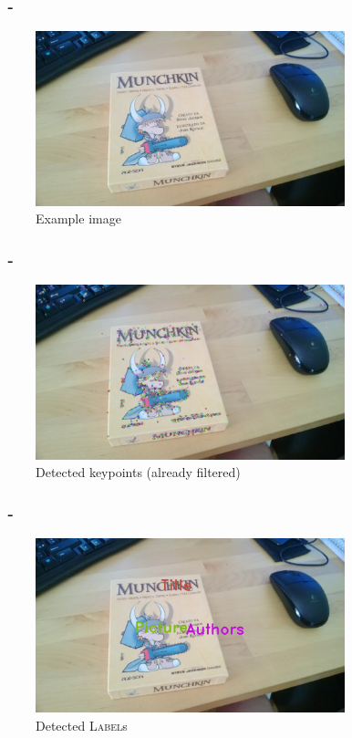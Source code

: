\documentclass{beamer}
\begin{document}
  \begin{frame}
    \frametitle{\insertsection\ - \insertsubsection}
	\begin{figure}
		\centering
          \includegraphics[width=0.8\textwidth]{images/sample.jpg}
        \caption{Example image\label{fig:example}}
	\end{figure}
  \end{frame}

  \begin{frame}
    \frametitle{\insertsection\ - \insertsubsection}
	\begin{figure}
		\centering
          \includegraphics[width=0.8\textwidth]{images/sampleKeypoints.jpg}
        \caption{Detected keypoints (already filtered)\label{fig:keypoints}}
	\end{figure}
  \end{frame}

  \begin{frame}
    \frametitle{\insertsection\ - \insertsubsection}
	\begin{figure}
		\centering
          \includegraphics[width=0.8\textwidth]{images/sampleLabels.jpg}
        \caption{Detected \textsc{Label}s\label{fig:labels}}
	\end{figure}
  \end{frame}
\end{document}
